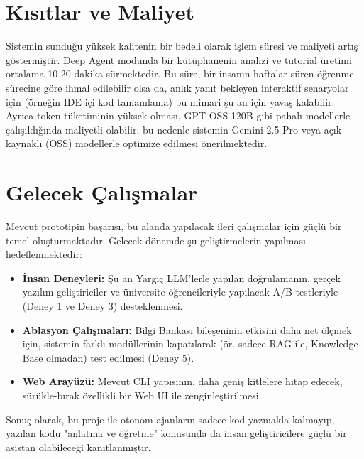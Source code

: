 \section{Kısıtlar ve Maliyet}

Sistemin sunduğu yüksek kalitenin bir bedeli olarak işlem süresi ve maliyeti artış göstermiştir. Deep Agent modunda bir kütüphanenin analizi ve tutorial üretimi ortalama 10-20 dakika sürmektedir. Bu süre, bir insanın haftalar süren öğrenme sürecine göre ihmal edilebilir olsa da, anlık yanıt bekleyen interaktif senaryolar için (örneğin IDE içi kod tamamlama) bu mimari şu an için yavaş kalabilir. Ayrıca token tüketiminin yüksek olması, GPT-OSS-120B gibi pahalı modellerle çalışıldığında maliyetli olabilir; bu nedenle sistemin Gemini 2.5 Pro veya açık kaynaklı (OSS) modellerle optimize edilmesi önerilmektedir.

\section{Gelecek Çalışmalar}

Mevcut prototipin başarısı, bu alanda yapılacak ileri çalışmalar için güçlü bir temel oluşturmaktadır. Gelecek dönemde şu geliştirmelerin yapılması hedeflenmektedir:

\begin{itemize}
    \item \textbf{İnsan Deneyleri:} Şu an Yargıç LLM'lerle yapılan doğrulamanın, gerçek yazılım geliştiriciler ve üniversite öğrencileriyle yapılacak A/B testleriyle (Deney 1 ve Deney 3) desteklenmesi.
    \item \textbf{Ablasyon Çalışmaları:} Bilgi Bankası bileşeninin etkisini daha net ölçmek için, sistemin farklı modüllerinin kapatılarak (ör. sadece RAG ile, Knowledge Base olmadan) test edilmesi (Deney 5).
    \item \textbf{Web Arayüzü:} Mevcut CLI yapısının, daha geniş kitlelere hitap edecek, sürükle-bırak özellikli bir Web UI ile zenginleştirilmesi.
\end{itemize}

Sonuç olarak, bu proje ile otonom ajanların sadece kod yazmakla kalmayıp, yazılan kodu "anlatma ve öğretme" konusunda da insan geliştiricilere güçlü bir asistan olabileceği kanıtlanmıştır.

